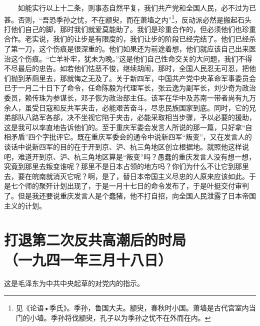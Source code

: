 \documentclass[cn,11pt,chinese]{elegantbook}
\def\myformat#1{\hfil\hfil #1}
\begin{document}
　　如能实行以上十二条，则事态自然平复，我们共产党和全国人民，必不过为已甚。否则，“吾恐季孙之忧，不在颛臾，而在萧墙之内”\footnote[5]{ 见《论语•季氏》。季孙，鲁国大夫。颛臾，春秋时小国。萧墙是古代宫室内当门的小墙。季孙将伐颛臾，孔子以为季孙之忧不在外而在内。}，反动派必然是搬起石头打他们自己的脚，那时我们就爱莫能助了。我们是珍重合作的，但必须他们也珍重合作。老实说，我们的让步是有限度的，我们让步的阶段已经完结了。他们已经杀了第一刀，这个伤痕是很深重的。他们如果还为前途着想，他们就应该自己出来医治这个伤痕。“亡羊补牢，犹未为晚。”这是他们自己性命交关的大问题，我们不得不尽最后的忠告。如若他们怙恶不悛，继续胡闹，那时，全国人民忍无可忍，把他们抛到茅厕里去，那就悔之无及了。关于新四军，中国共产党中央革命军事委员会已于一月二十日下了命令，任命陈毅为代理军长，张云逸为副军长，刘少奇为政治委员，赖传珠为参谋长，邓子恢为政治部主任。该军在华中及苏南一带者尚有九万余人，虽受日寇和反共军夹击，必能艰苦奋斗，尽忠民族国家到底。同时，它的兄弟部队八路军各部，决不坐视它陷于夹击，必能采取相当步骤，予以必要的援助，这是我可以率直地告诉他们的。至于重庆军委会发言人所说的那一篇，只好拿“自相矛盾”四个字批评它。既在重庆军委会的通令中说新四军“叛变”，又在发言人的谈话中说新四军的目的在于开到京、沪、杭三角地区创立根据地。就照他这样说吧，难道开到京、沪、杭三角地区算是“叛变”吗？愚蠢的重庆发言人没有想一想，究竟到那里去叛变谁呢？那里不是日本占领的地方吗？你们为什么不让它到那里去，要在皖南就消灭它呢？啊，是了，替日本帝国主义尽忠的人原来应该如此。于是七个师的聚歼计划出现了，于是一月十七日的命令发布了，于是叶挺交付审判了。但是我还要说重庆发言人是个蠢猪，他不打自招，向全国人民泄露了日本帝国主义的计划。\\
\newpage\section*{\myformat{打退第二次反共高潮后的时局}\\\myformat{（一九四一年三月十八日）}}
\begin{introduction}\item  这是毛泽东为中共中央起草的对党内的指示。\end{introduction}
\end{document}

